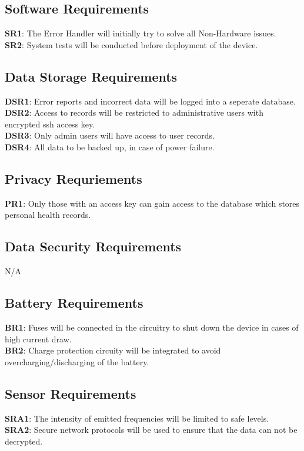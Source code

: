 \documentclass{article}
\begin{document}
\subsection{Software  Requirements}
\textbf{SR1}: The Error Handler will initially try to solve all Non-Hardware issues.\\
\textbf{SR2}: System tests will be conducted before deployment of the device.\\


\subsection{Data Storage Requirements }
\textbf{DSR1}: Error reports and incorrect data will be logged into a seperate database.\\
\textbf{DSR2}: Access to records will be restricted to administrative users with encrypted ssh access key.\\
\textbf{DSR3}: Only admin users will have access to user records.\\
\textbf{DSR4}: All data to be backed up, in case of power failure.\\

\subsection{Privacy Requriements}
\textbf{PR1}: Only those with an access key can gain access to the database which stores personal health records.


\subsection{Data Security Requirements }
N/A

\subsection{Battery Requirements}
\textbf{BR1}: Fuses will be connected in the circuitry to shut down the device in cases of high current draw.
\\
\textbf{BR2}: Charge protection circuity will be integrated to avoid overcharging/discharging of the battery.

\subsection{Sensor Requirements}
\textbf{SRA1}: The intensity of emitted frequencies will be limited to safe levels.
\\
\textbf{SRA2}: Secure network protocols will be used to ensure that the data can not be decrypted.
\end{document}
